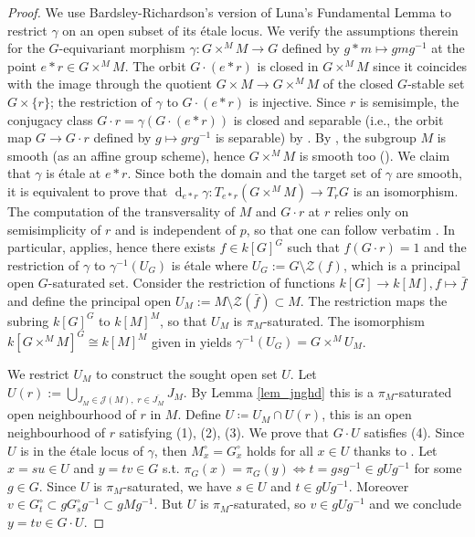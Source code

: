 \documentclass[12pt]{amsart}
\theoremstyle{definition}
\theoremstyle{remark}
\newcommand{\diff}{\operatorname{d}}
\begin{document}
\begin{proof}
We  use Bardsley-Richardson's version of Luna's Fundamental Lemma  \cite[Theorem 6.2]{BR} to restrict $\gamma$ on an open subset of its \'etale locus.
We verify the assumptions therein for the $G$-equivariant morphism $\gamma \colon G \times^M M \to G$ defined by $g * m \mapsto g m g^{-1}$ at the point $e *r \in G \times^M M$.
The orbit $G \cdot (e*r)$  is closed in $G \times^M M$ since it coincides with the image through the quotient $G \times M \to G \times^M M$ of the closed $G$-stable set $G \times \{r\}$; the restriction of $\gamma$ to $G \cdot (e*r)$ is injective.
Since $r$ is semisimple, the conjugacy class $G \cdot r = \gamma(G \cdot (e*r))$ is closed and separable (i.e., the orbit map $G \to G \cdot r$ defined by $g \mapsto g  r g^{-1} $ is separable) by \cite[Proposition 9.1]{Bo}.
By \cite[Proposition A.8.12]{CGP}, the subgroup $M$ is smooth  (as an affine group scheme), hence $G \times^M M$ is smooth too (\cite[proof of Proposition 7.3]{BR}).
We claim that $\gamma$ is \'etale at $e * r$.
Since both the domain and the target set of $\gamma$ are smooth, it is equivalent to prove that $\diff_{e*r}\gamma \colon T_{e *r} (G \times^M M) \to T_r G$ is an isomorphism.
The computation of the transversality of $M$ and $G \cdot r$ at $r$
relies only on semisimplicity of $r$ and is independent of $p$, so that one can follow verbatim  \cite[proof of Proposition 4.1]{ACE}.
In particular, \cite[Theorem 6.2]{BR} applies, hence there exists $f \in k[G]^G$ such that $f(G \cdot r) = 1$ and the restriction of $\gamma$ to $\gamma^{-1}(U_G)$ is \'etale where $U_G := G \setminus \mathcal{Z}(f)$, which is a principal open $G$-saturated set.
Consider the restriction of functions $k[G] \to k[M], f \mapsto \bar f$ and define the principal open $U_M := M \setminus \mathcal{Z}(\bar{f}) \subset M$.
The restriction maps the subring $k[G]^G$ to $k[M]^M$, so that $U_M$ is $\pi_M$-saturated.
The isomorphism $k[G \times^M M]^G \cong k[M]^M$ given in \cite[5.3.3]{BR} yields 
$\gamma^{-1}(U_G) = G \times^M U_M$.

We restrict $U_M$ to construct the sought open set $U$.
Let $U(r) := \bigcup_{J_M \in \mathcal{J}(M), \; r \in \overline{J_M}} J_M$. By Lemma \ref{lem_jnghd} this is a $\pi_M$-saturated open neighbourhood of $r$ in $M$.
Define $U \coloneqq U_M \cap U(r)$, this is an open neighbourhood of $r$ satisfying (1), (2), (3).
We prove that $G \cdot U$ satisfies (4).
Since $U$ is in the \'etale locus of $\gamma$, then  $M_x^\circ = G_x^\circ$ holds for all $x \in U$ thanks to \cite[Remark 4.2]{ACE}.
Let $x= su \in U$ and $y=tv \in G$ s.t. $\pi_G(x) = \pi_G(y) \Leftrightarrow t = gsg^{-1} \in gUg^{-1}$ for some $g \in G$.
Since $U$ is $\pi_M$-saturated, we have $s \in U$ and $t \in gUg^{-1}$.
Moreover  $v \in G_t^\circ \subset g G_s^\circ g^{-1} \subset g M g^{-1}$.
But $U$ is $\pi_M$-saturated, so $v \in gUg^{-1}$ and we conclude $y = tv \in G \cdot U$.
\end{proof}
\end{document}
